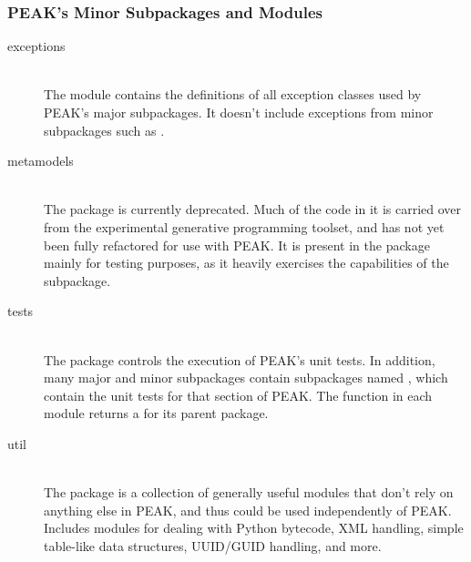 \subsubsection{PEAK's Minor Subpackages and Modules}

\begin{description}

\item[exceptions] \hfill \\ 
The  module contains the definitions of all exception
classes used by PEAK's major subpackages.  It doesn't include exceptions from
minor subpackages such as .

\item[metamodels] \hfill \\ 
The  package is currently deprecated.  Much of the code
in it is carried over from the experimental  generative
programming toolset, and has not yet been fully refactored for use with PEAK.
It is present in the package mainly for testing purposes, as it heavily 
exercises the capabilities of the  subpackage.

\item[tests] \hfill \\ 
The  package controls the execution of PEAK's unit tests.
In addition, many major and minor subpackages contain subpackages named
, which contain the unit tests for that section of PEAK.  The
 function in each  module returns a
 for its parent package.

\item[util] \hfill \\ 
The  package is a collection of generally useful modules
that don't rely on anything else in PEAK, and thus could be used
independently of PEAK.  Includes modules for dealing with Python bytecode,
XML handling, simple table-like data structures, UUID/GUID handling, and more.

\end{description}


















